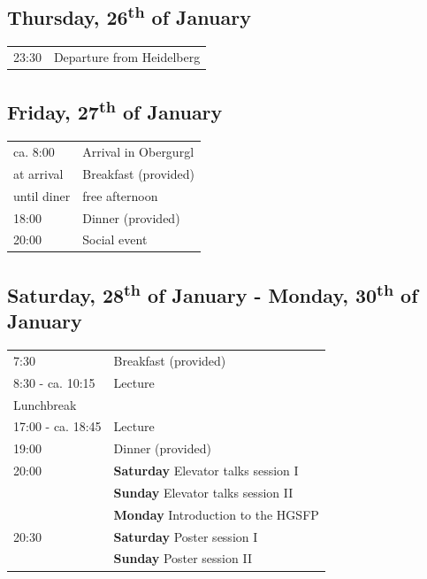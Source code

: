 
\noindent
{}

\subsection*{Thursday, 26\textsuperscript{th} of January}

\begin{tabular}{p{2.5cm}p{11.5cm}}
	23:30 & Departure from Heidelberg \\
\end{tabular}

\subsection*{Friday, 27\textsuperscript{th} of January}

\begin{tabular}{p{2.5cm}p{11.5cm}}
	ca. 8:00 & Arrival in Obergurgl \\ 
	at arrival & Breakfast (provided) \\ 
	until diner & free afternoon \\
	18:00 & Dinner (provided) \\
	20:00 & Social event \\
\end{tabular}

\subsection*{Saturday, 28\textsuperscript{th} of January - Monday, 30\textsuperscript{th} of January}

\begin{tabular}{p{2.5cm}p{6cm}}
	7:30 & Breakfast (provided) \\
	8:30 - ca. 10:15 & Lecture \\ 
	\cline{1-2}
	Lunchbreak \\
	\cline{1-2}
	17:00 - ca. 18:45 & Lecture \\ 
	19:00 & Dinner (provided) \\
	20:00 & \textbf{Saturday} Elevator talks session I \\
		  & \textbf{Sunday}  Elevator talks session II \\
		  & \textbf{Monday} Introduction to the HGSFP \\
	20:30 & \textbf{Saturday} Poster session I \\
		  & \textbf{Sunday}  Poster session II \\
		
\end{tabular}

